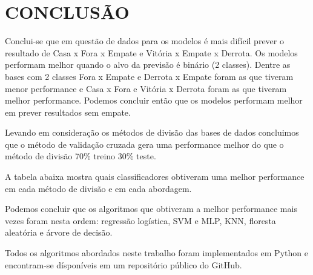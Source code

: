 \section{CONCLUSÃO}
	Conclui-se que em questão de dados para os modelos é mais difícil prever o resultado de Casa x Fora x Empate e Vitória x Empate x Derrota. Os modelos performam melhor quando o alvo da previsão é binário (2 classes). Dentre as bases com 2 classes Fora x Empate e Derrota x Empate foram as que tiveram menor performance e Casa x Fora e Vitória x Derrota foram as que tiveram melhor performance. Podemos concluir então que os modelos performam melhor em prever resultados sem empate.
	
	Levando em consideração os métodos de divisão das bases de dados concluimos que o método de validação cruzada gera uma performance melhor do que o método de divisão 70\% treino 30\% teste.
	
	A tabela abaixa mostra quais classificadores obtiveram uma melhor performance em cada método de divisão e em cada abordagem.

\begin{table}[h]
\caption{Classificadores com melhor performance em cada método de divisão e abordagem.}
\label{cron}
\end{table}

	Podemos concluir que os algoritmos que obtiveram a melhor performance mais vezes foram nesta ordem: regressão logística, SVM e MLP, KNN, floresta aleatória e árvore de decisão.
	
	Todos os algoritmos abordados neste trabalho foram implementados em Python e encontram-se dísponíveis em um repositório público do GitHub.